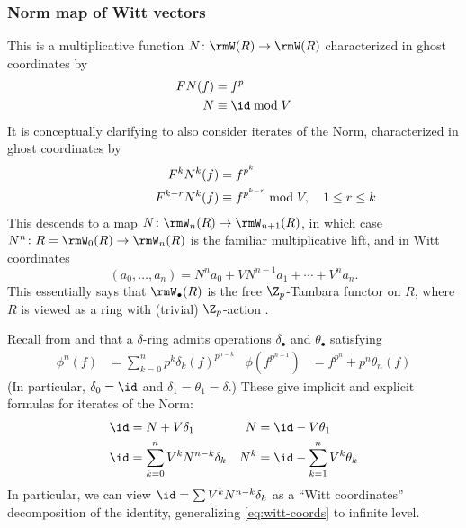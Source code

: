 \subsubsection{Norm map of Witt vectors}
This is a multiplicative function $N\colon \rmW(R) \to \rmW(R)$ characterized in ghost coordinates by
\begin{align*}
  FN(f) &= f^p\\
  N &\equiv \id \bmod V
\end{align*}
It is conceptually clarifying to also consider iterates of the Norm, characterized in ghost coordinates by
\begin{align*}
  F^k N^k(f) &= f^{p^k}\\
  F^{k-r} N^k(f) &\equiv f^{p^{k-r}} \bmod V, \quad 1\le r\le k\hspace{-5.1em}
\end{align*}
This descends to a map $N\colon \rmW_n(R) \to \rmW_{n+1}(R)$, in which case $N^n\colon R = \rmW_0(R) \to \rmW_n(R)$ is the familiar multiplicative lift, and in Witt coordinates
\begin{equation}
  \label{eq:witt-coords}
  (a_0, \dotsc, a_n) = N^n a_0 + VN^{n-1} a_1 + \dotsb + V^n a_n.
\end{equation}
This essentially says that $\rmW_\bullet(R)$ is the free $\Z_p$-Tambara functor on $R$, where $R$ is viewed as a ring with (trivial) $\Z_p$-action \cite{BrunWitt}.

Recall from \cite[Proposition 1]{JoyalDeltaWitt} and \cite[Lemma B.1]{DrinfeldFormalGroup} that a $\delta$-ring admits operations $\delta_\bullet$ and $\theta_\bullet$ satisfying
\begin{align*}
  \phi^n(f) &= \sum_{k=0}^n p^k \delta_k(f)^{p^{n-k}} &
  \phi(f^{p^{n-1}}) &= f^{p^n} + p^n \theta_n(f)
\end{align*}
(In particular, $\delta_0 = \id$ and $\delta_1 = \theta_1 = \delta$.) These give implicit and explicit formulas for iterates of the Norm:
\begin{align*}
  \id &= N + V\delta_1 &
  N &= \id - V\theta_1\\
  \id &= \sum_{k=0}^n V^k N^{n-k} \delta_k &
  N^k &= \id - \sum_{k=1}^n V^k \theta_k
\end{align*}
In particular, we can view $\id = \sum V^k N^{n-k} \delta_k$ as a ``Witt coordinates'' decomposition of the identity, generalizing \eqref{eq:witt-coords} to infinite level.

